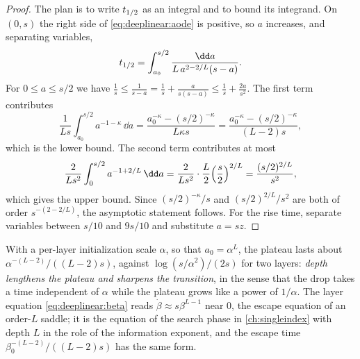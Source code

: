 \begin{refsection}

\begin{proof}
The plan is to write $t_{1/2}$ as an integral and to bound its integrand. On $(0,s)$ the right side of \eqref{eq:deeplinear:aode} is positive, so $a$ increases, and separating variables,
\[
  \dlhalf=\int_{a_0}^{s/2}\frac{\dd a}{L\,a^{2-2/L}(s-a)} .
\]
For $0\le a\le s/2$ we have $\frac1s\le\frac1{s-a}=\frac1s+\frac{a}{s(s-a)}\le\frac1s+\frac{2a}{s^2}$. The first term contributes
\[
  \frac1{Ls}\int_{a_0}^{s/2}a^{-1-\kappa}\,\dd a=\frac{a_0^{-\kappa}-(s/2)^{-\kappa}}{L\kappa s}=\frac{a_0^{-\kappa}-(s/2)^{-\kappa}}{(L-2)s},
\]
which is the lower bound. The second term contributes at most
\[
  \frac2{Ls^2}\int_0^{s/2}a^{-1+2/L}\,\dd a=\frac2{Ls^2}\cdot\frac L2\Bigl(\frac s2\Bigr)^{2/L}=\frac{(s/2)^{2/L}}{s^2},
\]
which gives the upper bound. Since $(s/2)^{-\kappa}/s$ and $(s/2)^{2/L}/s^2$ are both of order $s^{-(2-2/L)}$, the asymptotic statement follows. For the rise time, separate variables between $s/10$ and $9s/10$ and substitute $a=sz$.
\end{proof}

With a per-layer initialization scale $\alpha$, so that $a_0=\alpha^L$, the plateau lasts about $\alpha^{-(L-2)}/((L-2)s)$, against $\log(s/\alpha^2)/(2s)$ for two layers: \emph{depth lengthens the plateau and sharpens the transition}, in the sense that the drop takes a time independent of $\alpha$ while the plateau grows like a power of $1/\alpha$. The layer equation \eqref{eq:deeplinear:beta} reads $\dot\beta\approx s\beta^{L-1}$ near $0$, the escape equation of an order-$L$ saddle; it is the equation of the search phase in \cref{ch:singleindex} with depth $L$ in the role of the information exponent, and the escape time $\beta_0^{-(L-2)}/((L-2)s)$ has the same form.


\end{refsection}
